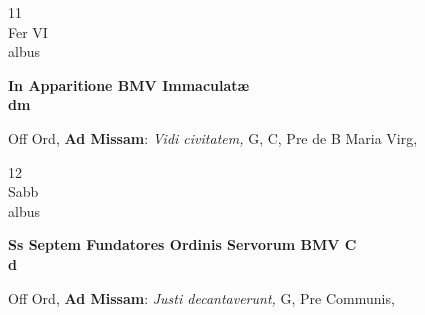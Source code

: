 \documentclass[10pt, openany]{book}
\begin{document}
        \begin{center}
            \begin{minipage}{3.5in}
                \vspace{2em}
                \begin{minipage}{0.5in}
                    {\Huge 11} \\
                    {\normalsize Fer VI} \\
                    {\normalsize albus}
                \end{minipage}
                \begin{minipage}{3.0in}
                    \textbf{ \large In Apparitione BMV Immaculatæ \\
                    \textnormal{\normalsize dm}} \\ 
                \end{minipage}
                \begin{justify}Off Ord, \textbf{Ad Missam}: \textit{Vidi civitatem,} G, C, Pre de B Maria Virg,   
                \end{justify}
            \end{minipage}
        \end{center}
    
        \begin{center}
            \begin{minipage}{3.5in}
                \vspace{2em}
                \begin{minipage}{0.5in}
                    {\Huge 12} \\
                    {\normalsize Sabb} \\
                    {\normalsize albus}
                \end{minipage}
                \begin{minipage}{3.0in}
                    \textbf{ \large Ss Septem Fundatores Ordinis Servorum BMV C \\
                    \textnormal{\normalsize d}} \\ 
                \end{minipage}
                \begin{justify}Off Ord, \textbf{Ad Missam}: \textit{Justi decantaverunt,} G, Pre Communis,   
                \end{justify}
            \end{minipage}
        \end{center}
    
\end{document}
